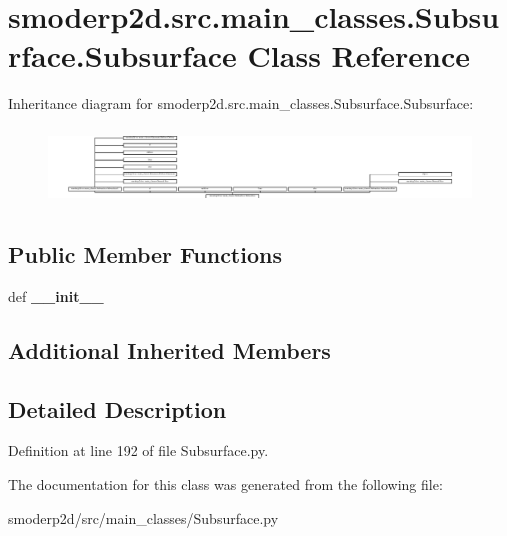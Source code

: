 \hypertarget{classsmoderp2d_1_1src_1_1main__classes_1_1Subsurface_1_1Subsurface}{\section{smoderp2d.\-src.\-main\-\_\-classes.\-Subsurface.\-Subsurface Class Reference}
\label{classsmoderp2d_1_1src_1_1main__classes_1_1Subsurface_1_1Subsurface}
}
Inheritance diagram for smoderp2d.\-src.\-main\-\_\-classes.\-Subsurface.\-Subsurface\-:\begin{figure}[H]
\begin{center}
\leavevmode
\includegraphics[height=2.068965cm]{d9/df4/classsmoderp2d_1_1src_1_1main__classes_1_1Subsurface_1_1Subsurface}
\end{center}
\end{figure}
\subsection*{Public Member Functions}
\begin{DoxyCompactItemize}
\item 
\hypertarget{classsmoderp2d_1_1src_1_1main__classes_1_1Subsurface_1_1Subsurface_a64abac9f92b883482bdeba247c6b5d44}{def {\bfseries \-\_\-\-\_\-init\-\_\-\-\_\-}}\label{classsmoderp2d_1_1src_1_1main__classes_1_1Subsurface_1_1Subsurface_a64abac9f92b883482bdeba247c6b5d44}

\end{DoxyCompactItemize}
\subsection*{Additional Inherited Members}


\subsection{Detailed Description}


Definition at line 192 of file Subsurface.\-py.



The documentation for this class was generated from the following file\-:\begin{DoxyCompactItemize}
\item 
smoderp2d/src/main\-\_\-classes/Subsurface.\-py\end{DoxyCompactItemize}
